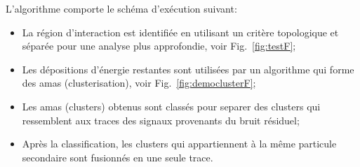 L'algorithme comporte le sch\'ema d'ex\'ecution suivant:
\begin{itemize}
	\item La région d'interaction est identifiée en utilisant un critère topologique et séparée pour une analyse plus approfondie, voir Fig.~\ref{fig:testF};
	\item Les dépositions d'énergie restantes sont utilisées par un algorithme qui forme des amas (clusterisation), voir Fig.~\ref{fig:democlusterF};
	\item Les amas (clusters)  obtenus sont classés pour separer des clusters qui ressemblent aux traces des signaux provenants du bruit résiduel; 
	\item Après la classification, les clusters qui appartiennent à la même particule secondaire   sont fusionnés en une seule trace.
	
\end{itemize}
